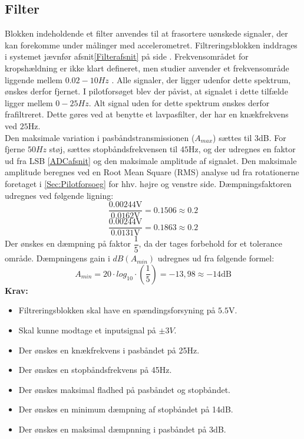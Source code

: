 \subsection{Filter}\label{FilterAfs}
Blokken indeholdende et filter anvendes til at frasortere uønskede signaler, der kan forekomme under målinger med accelerometret. Filtreringsblokken inddrages i systemet jævnfør afsnit\ref{Filterafsnit} på side \pageref{Filterafsnit}. Frekvensområdet for kropshældning er ikke klart defineret, men studier anvender et frekvensområde liggende mellem $0.02-10Hz$ \cite{Martinez-Mendez2011}. Alle signaler, der ligger udenfor dette spektrum, ønskes derfor fjernet. I pilotforsøget blev der påvist, at signalet i dette tilfælde ligger mellem $0-25Hz$. Alt signal uden for dette spektrum ønskes derfor frafiltreret. Dette gøres ved at benytte et lavpasfilter, der har en knækfrekvens ved $25$Hz. \\
Den maksimale variation i pasbåndstransmissionen ($A_{max}$) sættes til $3$dB. For fjerne $50Hz$ støj, sættes stopbåndsfrekvensen til $45$Hz, og der udregnes en faktor ud fra LSB \ref{ADCafsnit} og den maksimale amplitude af signalet. Den maksimale amplitude beregnes ved en Root Mean Square (RMS) analyse ud fra rotationerne foretaget i \ref{Sec:Pilotforsoeg} for hhv. højre og venstre side. Dæmpningsfaktoren udregnes ved følgende ligning:
\begin{equation}
\dfrac{0.00244\text{V}}{0.0162\text{V}} = 0.1506 \approx 0.2 
\end{equation}
\begin{equation}
\dfrac{0.00244\text{V}}{0.0131\text{V}} = 0.1863  \approx 0.2
\end{equation}
Der ønskes en dæmpning på faktor $\dfrac{1}{5}$, da der tages forbehold for et tolerance område. Dæmpningens gain i $dB(A_{min})$ udregnes ud fra følgende formel:   
\begin{equation}
A_{min}=20 \cdot log_{10} \cdot (\frac{1}{5}) = -13,98 \approx -14\text{dB}
\end{equation}
\textbf{Krav:}
\begin{itemize}
	\item Filtreringsblokken skal have en spændingsforsyning på $5.5$V.
	\item Skal kunne modtage et inputsignal på $\pm3V$.
	\item Der ønskes en knækfrekvens i pasbåndet på 25Hz.
	\item Der ønskes en stopbåndsfrekvens på 45Hz.
	\item Der ønskes maksimal fladhed på pasbåndet og stopbåndet.
	\item Der ønskes en minimum dæmpning af stopbåndet på 14dB.
	\item Der ønskes en maksimal dæmpnning i pasbåndet på 3dB.
\end{itemize}
